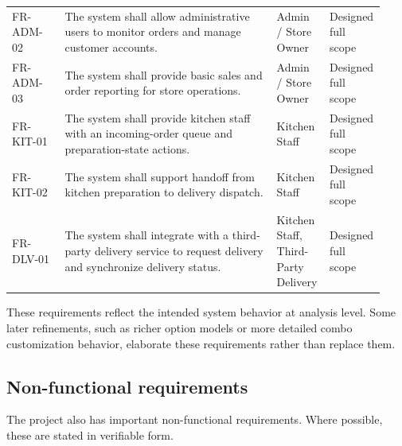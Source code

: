 \begin{tabular}{L{0.14\linewidth} L{0.56\linewidth} L{0.14\linewidth} L{0.09\linewidth}}
FR-ADM-02 & The system shall allow administrative users to monitor orders and manage customer accounts. & Admin / Store Owner & Designed full scope \\
FR-ADM-03 & The system shall provide basic sales and order reporting for store operations. & Admin / Store Owner & Designed full scope \\
FR-KIT-01 & The system shall provide kitchen staff with an incoming-order queue and preparation-state actions. & Kitchen Staff & Designed full scope \\
FR-KIT-02 & The system shall support handoff from kitchen preparation to delivery dispatch. & Kitchen Staff & Designed full scope \\
FR-DLV-01 & The system shall integrate with a third-party delivery service to request delivery and synchronize delivery status. & Kitchen Staff, Third-Party Delivery & Designed full scope \\
\bottomrule
\end{tabular}
\endgroup

These requirements reflect the intended system behavior at analysis level. Some later refinements, such as richer option models or more detailed combo customization behavior, elaborate these requirements rather than replace them.

\subsection{Non-functional requirements}

The project also has important non-functional requirements. Where possible, these are stated in verifiable form.

